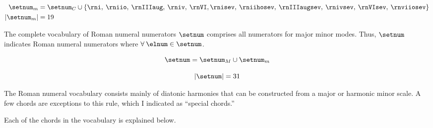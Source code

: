 \begin{equation}
    \label{eq:minor_numerators}
    \begin{split}
    \setnum_{m} &= \setnum_{C} \cup  \{ \rni, \: \rniio, \: 
    \rnIIIaug, \: \rniv, \: \rnVI, \rnisev, \: \rniihosev, \: 
    \rnIIIaugsev, \: \rnivsev, \: \rnVIsev, \: \rnviiosev \} \\
    | \setnum_{m} | &= 19
    \end{split}
\end{equation}


The complete vocabulary of Roman numeral numerators
$\setnum$ comprises all numerators for major minor modes.
Thus, $\setnum$ indicates Roman numeral numerators where
$\forall \: \elnum \in \setnum$.


\begin{equation}
    \setnum = \setnum_{M} \cup \setnum_{m}
\end{equation}

\begin{equation}
    | \setnum | = 31
\end{equation}



The Roman numeral vocabulary consists mainly of diatonic
harmonies that can be constructed from a major or harmonic
minor scale. A few chords are exceptions to this rule, \:
which I indicated as ``special chords.''

Each of the chords in the vocabulary is explained below.


